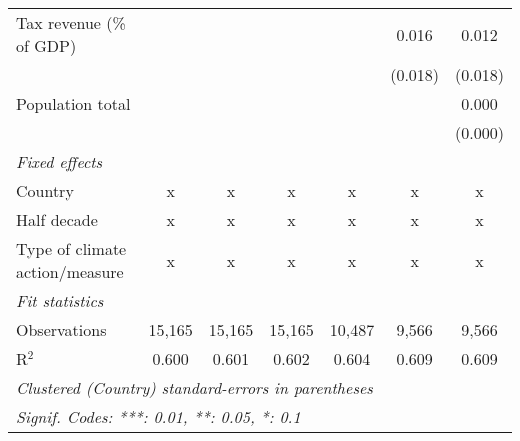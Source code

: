 \begin{tabular}{lcccccc}
   Tax revenue (\% of GDP)                &         &                &                &                & 0.016          & 0.012\\   
                                          &         &                &                &                & (0.018)        & (0.018)\\   
   Population total                       &         &                &                &                &                & 0.000\\   
                                          &         &                &                &                &                & (0.000)\\   
   \emph{Fixed effects}\\
   Country                                & x       & x              & x              & x              & x              & x\\  
   Half decade                            & x       & x              & x              & x              & x              & x\\  
   Type of climate action/measure         & x       & x              & x              & x              & x              & x\\  
   \midrule \emph{Fit statistics}\\
   Observations                           & 15,165  & 15,165         & 15,165         & 10,487         & 9,566          & 9,566\\  
   R$^2$                                  & 0.600   & 0.601          & 0.602          & 0.604          & 0.609          & 0.609\\  
   \midrule
   \multicolumn{7}{l}{\emph{Clustered (Country) standard-errors in parentheses}}\\
   \multicolumn{7}{l}{\emph{Signif. Codes: ***: 0.01, **: 0.05, *: 0.1}}\\
\end{tabular}
\par\endgroup


